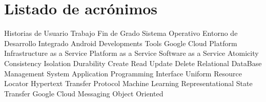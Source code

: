 \chapter{Listado de acrónimos}

{\small
\begin{acronym}[XXXXXXXX]
  		 {Historias de Usuario}	
   	 {Trabajo Fin de Grado}
  		 {Sistema Operativo}
   	 {Entorno de Desarrollo Integrado}
   	 {Android Developments Tools}
   	 {Google Cloud Platform}
      {Infrastructure as a Service}
      {Platform as a Service}
  	 {Software as a Service}
   	 {Atomicity Consistency Isolation Durability}
  	 {Create Read Update Delete}
  	 {Relational DataBase Management System}
       {Application Programming Interface}
   	 {Uniform Resource Locator}
   	 {Hypertext Transfer Protocol}
  		 {Machine Learning}
  	 {Representational State Transfer}
  	 {Google Cloud Messaging}
  		 {Object Oriented}
\end{acronym}
}




